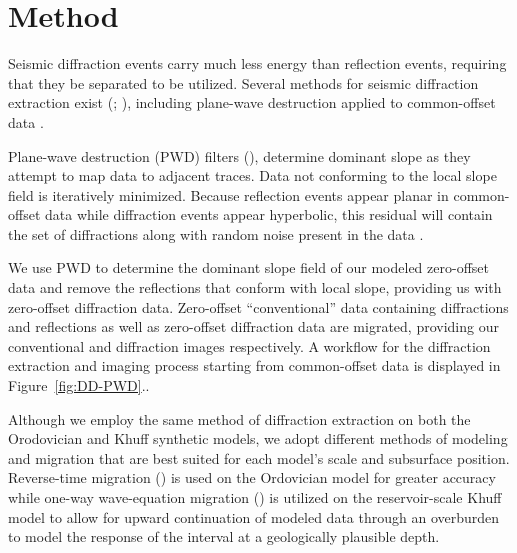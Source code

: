 \section{Method}
Seismic diffraction events carry much less energy than reflection events, requiring that they be separated to be utilized.  Several methods for seismic diffraction extraction exist (\citealp{harl,landa1987,kanasewich}; \citealp{khadi,landa,klokov}), including plane-wave destruction applied to common-offset data \cite[]{fomel2}.
\par
Plane-wave destruction (PWD) filters (\citealp{claer,fomel1}), determine  dominant slope  as they attempt to map data to adjacent traces.  Data not conforming to the local slope field is iteratively minimized.   Because reflection events appear planar in common-offset data while diffraction events appear hyperbolic, this residual will contain the set of diffractions along with random noise present in the data \cite[]{harl}. 
\par
{}We use PWD to determine the dominant slope field of our modeled zero-offset data and remove the reflections that conform with local slope, providing us with zero-offset diffraction data.  Zero-offset ``conventional'' data containing diffractions and reflections as well as zero-offset diffraction data are migrated, providing our conventional and diffraction images respectively.  A workflow for the diffraction extraction and imaging process starting from common-offset data is displayed in Figure~\ref{fig:DD-PWD}.\cite[]{decker}\cite[]{decker2014}.

\par
Although we employ the same method of diffraction extraction on both the Orodovician and Khuff synthetic models, we adopt different methods of modeling and migration that are best suited for each model's scale and subsurface position.  Reverse-time migration (\citealp{zhang2009,fomel2013}) is used on the Ordovician model for greater accuracy while one-way wave-equation migration (\citealp{gazdag1984,kessinger1992}) is utilized on the reservoir-scale Khuff model to allow for upward continuation of modeled data through an overburden\old{,} to model the response of the interval at a geologically plausible depth.

